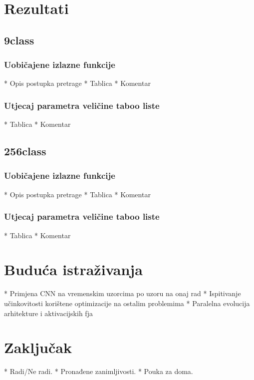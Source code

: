 \documentclass[times, utf8, diplomski]{fer}
\begin{document}
\chapter{Rezultati}

\section{9class}

\subsection{Uobičajene izlazne funkcije}
* Opis postupka pretrage
* Tablica
* Komentar

\subsection{Utjecaj parametra veličine taboo liste}
* Tablica
* Komentar

\section{256class}

\subsection{Uobičajene izlazne funkcije}
* Opis postupka pretrage
* Tablica
* Komentar

\subsection{Utjecaj parametra veličine taboo liste}
* Tablica
* Komentar

\chapter{Buduća istraživanja}
* Primjena CNN na vremenskim uzorcima po uzoru na onaj rad
* Ispitivanje učinkovitosti korištene optimizacije na ostalim problemima
* Paralelna evolucija arhitekture i aktivacijskih fja

\chapter{Zaključak}
* Radi/Ne radi. 
* Pronađene zanimljivosti. 
* Pouka za doma.



\end{document}
